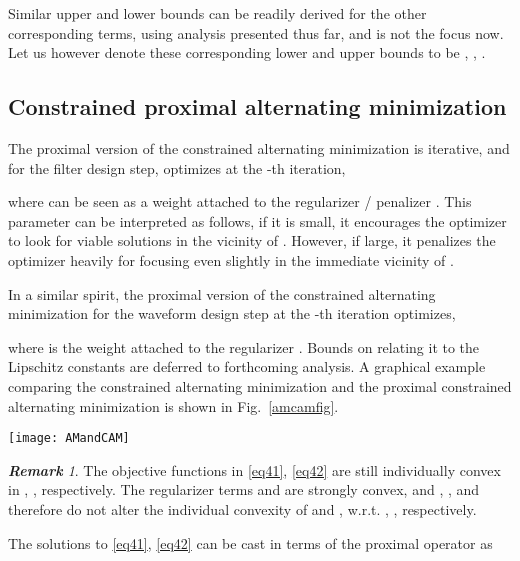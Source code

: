 \documentclass[11pt,draftclsnofoot,onecolumn]{IEEEtran}
\theoremstyle{definition}
\theoremstyle{remark}
\newtheorem{remk}{\bf Remark}
\begin{document}
 Similar upper and lower bounds can be readily derived for the other corresponding terms,   using analysis presented thus far, and is not the focus now. Let us however denote these corresponding lower and upper bounds to be , , .

\subsection{Constrained proximal alternating minimization}
The proximal version of the constrained alternating minimization is iterative, and for the filter design step, optimizes at the -th iteration,

where  can be seen as a weight attached to the regularizer / penalizer  . This parameter can be interpreted as follows, if it is small,  it encourages the optimizer to look for viable solutions in the vicinity of . However, if large, it penalizes the optimizer heavily for focusing even slightly in the immediate vicinity of  .

In a similar spirit, the proximal version of the constrained alternating minimization for the waveform design step at the  -th iteration optimizes,

where  is the weight attached to the regularizer . Bounds on  relating it to the Lipschitz constants are deferred to forthcoming analysis. A graphical example comparing the constrained alternating minimization and the proximal constrained alternating minimization is shown in Fig.~\ref{amcamfig}.

\begin{figure*}[tbp!]
\centering
\texttt{[image: AMandCAM]}
\caption{Constrained alternating minimization (left) and proximal constrained alternating minimization (right). Iso level contours (each point on a curve has identical function values) and constraint set in background are shown. Outer iso-curves assume higher function values than the inner iso-curves. On right, and for particular , , spheres (dashed, blue, dashed red) are the (two of the several) spheres of influence of the regularizer. Outer spheres penalize more than the inner.}
\label{amcamfig}
\end{figure*}

\begin{remk}\label{remark2}
The objective functions in \eqref{eq41}, \eqref{eq42} are still individually convex in , , respectively.
The regularizer terms  and    are strongly convex, and  , , and therefore do not alter the individual convexity of  and , w.r.t. , , respectively.
\end{remk}
The solutions to \eqref{eq41}, \eqref{eq42} can be cast in terms of the proximal operator as
 
\end{document}

